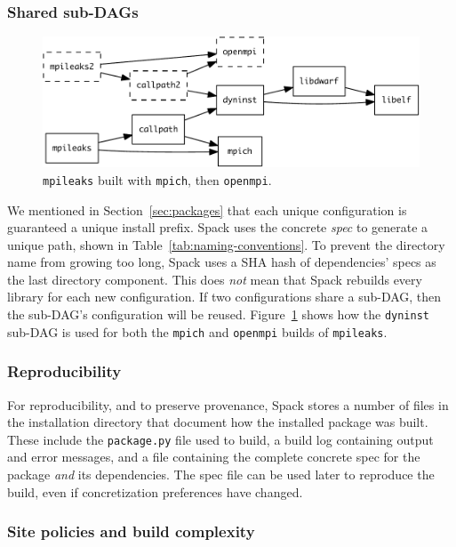 \subsubsection{Shared sub-DAGs}\label{sec:directory-layout}
\begin{figure}\centering
   \includegraphics[width=\linewidth]{specs/rpaths.pdf}
   \caption{
       {\tt mpileaks} built with {\tt mpich}, then {\tt openmpi}.
       \label{fig:reuse}
   }
\end{figure}

We mentioned in Section~\ref{sec:packages} that each unique configuration is
guaranteed a unique install prefix. Spack uses the concrete {\it spec}
to generate a unique path, shown in Table~\ref{tab:naming-conventions}.
To prevent the directory name from growing too long, Spack uses a SHA hash of
dependencies' specs as the last directory component.  This
does {\it not} mean that Spack rebuilds every library for each new configuration.
If two configurations share a sub-DAG, then the sub-DAG's configuration will
be reused.  Figure~\ref{fig:reuse} shows how the {\tt dyninst} sub-DAG is used for
both the {\tt mpich} and {\tt openmpi} builds of {\tt mpileaks}.


\subsubsection{Reproducibility}
For reproducibility, and to preserve provenance, Spack stores a number of
files in the installation directory that document how the installed package was
built.  These include the {\tt package.py} file used to build, a build log
containing output and error messages, and a file containing the complete
concrete spec for the package {\it and} its dependencies. The spec file can be
used later to reproduce the build, even if concretization preferences have changed.

\subsubsection{Site policies and build complexity}

